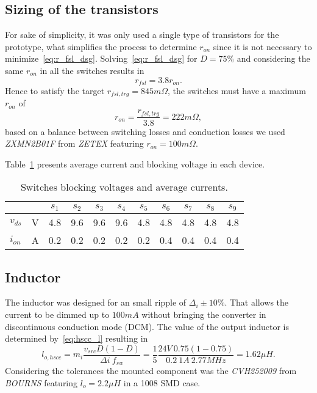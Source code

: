 \subsection{Sizing of the transistors}
For sake of simplicity, it was only used a single type of transistors for the prototype, what  simplifies the process to determine $r_{on}$ since it is not necessary to minimize~\eqref{eq:r_fsl_dsg}. Solving~\eqref{eq:r_fsl_dsg} for $D=75\%$ and considering the same $r_{on}$ in all the switches results in
\begin{equation}
    r_{fsl}  = 3.8 r_{on}  .
\end{equation}
Hence to satisfy the target $r_{fsl,trg}=845m\Omega$, the switches must have a maximum $r_{on}$ of
\begin{equation}
    r_{on}  = \frac{r_{fsl,trg}}{3.8} = 222m\Omega,
\end{equation}
based on a balance between switching losses and conduction losses we used \emph{ZXMN2B01F} from \emph{ZETEX} featuring $r_{on}=100m\Omega$.

Table~\ref{tab:switchs_results} presents average current and blocking voltage in each device.
\begin{table}[!h]
    \renewcommand{\arraystretch}{1.2}
    \centering
    \caption{Switches blocking voltages and average currents.}
    \label{tab:switchs_results}
    \begin{threeparttable}
    \begin{tabular}{ l c | c  c  c  c  c  c c c c }
            & & $s_1$   & $s_2$ & $s_3$   & $s_4$  & $s_5$ & $s_6$ & $s_7$ & $s_8$ & $s_9$  \\
    \midrule
            $v_{ds}$ & V & 4.8 & 9.6& 9.6 & 9.6 & 4.8 & 4.8 & 4.8 & 4.8 & 4.8 \\
            $i_{on}$ & A & 0.2 & 0.2& 0.2 & 0.2 & 0.2 & 0.4 & 0.4 & 0.4 & 0.4 \\

    \end{tabular}
    \end{threeparttable}
\end{table}

\subsection{Inductor}
The inductor was designed for an small ripple of  $\Delta _i \pm10\%$. That allows the current to be dimmed up to $100mA$ without bringing the converter in discontinuous conduction mode (DCM). The value of the output inductor is determined by~\eqref{eq:hscc_l} resulting in
\begin{equation}
 l_{o,hscc}  = m_i \frac{ v_{src} D (1-D)}{\Delta i~f_{sw} }= \frac{1}{5} \frac{24V~0.75(1-0.75)}{0.2~1A~2.77MHz} = 1.62\mu H.
\label{eq:hscc_l_II}
\end{equation}
Considering the tolerances the mounted component was the \emph{CVH252009} from \emph{BOURNS} featuring $l_o=2.2\mu H$ in a 1008 SMD case.


